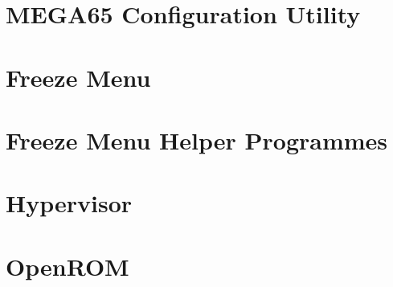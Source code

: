 \section{MEGA65 Configuration Utility}

\section{Freeze Menu}

\section{Freeze Menu Helper Programmes}

\section{Hypervisor}

\section{OpenROM}

